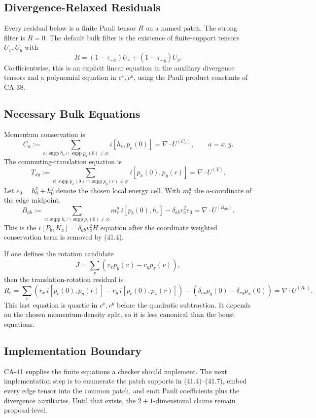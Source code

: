 \subsection{Divergence-Relaxed Residuals}

Every residual below is a finite Pauli tensor \(R\) on a named patch.  The
strong filter is \(R=0\).  The default bulk filter is the existence of
finite-support tensors \(U_x,U_y\) with
\[
  R=(1-\tau_{-\hat x})U_x+(1-\tau_{-\hat y})U_y.
  \tag{41.3}
\]
Coefficientwise, this is an explicit linear equation in the auxiliary
divergence tensors and a polynomial equation in \(c^x,c^y\), using the Pauli
product constants of CA-38.

\subsection{Necessary Bulk Equations}

Momentum conservation is
\[
  C_a:=
  \sum_{e:\operatorname{supp}h_e\cap\operatorname{supp}p_a(0)\neq\varnothing}
  i[h_e,p_a(0)]
  =\nabla\cdot U^{(C_a)},
  \qquad a=x,y.
  \tag{41.4}
\]
The commuting-translation equation is
\[
  T_{xy}:=
  \sum_{r:\operatorname{supp}p_x(0)\cap\operatorname{supp}p_y(r)\neq\varnothing}
  i[p_x(0),p_y(r)]
  =\nabla\cdot U^{(T)}.
  \tag{41.5}
\]
Let \(e_0=h^x_0+h^y_0\) denote the chosen local energy cell.  With
\(m_e^a\) the \(a\)-coordinate of the edge midpoint,
\[
  B_{ab}:=
  \sum_{e:\operatorname{supp}h_e\cap\operatorname{supp}p_b(0)\neq\varnothing}
  m_e^a\,i[p_b(0),h_e]
  -\delta_{ab}v_a^2 e_0
  =\nabla\cdot U^{(B_{ab})}.
  \tag{41.6}
\]
This is the \(i[P_b,K_a]=\delta_{ab}v_a^2H\) equation after the coordinate
weighted conservation term is removed by (41.4).

If one defines the rotation candidate
\[
  J=\sum_v(v_xp_y(v)-v_yp_x(v)),
\]
then the translation-rotation residual is
\[
  R_c=
  \sum_r\left(r_x\,i[p_c(0),p_y(r)]
        -r_y\,i[p_c(0),p_x(r)]\right)
  -(\delta_{cx}p_y(0)-\delta_{cy}p_x(0))
  =\nabla\cdot U^{(R_c)}.
  \tag{41.7}
\]
This last equation is quartic in \(c^x,c^y\) before the quadratic subtraction.
It depends on the chosen momentum-density split, so it is less canonical than
the boost equations.

\subsection{Implementation Boundary}

CA-41 supplies the finite equations a checker should implement.  The next
implementation step is to enumerate the patch supports in (41.4)--(41.7),
embed every edge tensor into the common patch, and emit Pauli coefficients plus
the divergence auxiliaries.  Until that exists, the \(2+1\)-dimensional claims
remain proposal-level.

